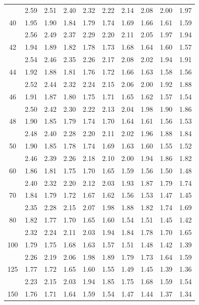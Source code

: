 \documentclass[lang=cn,10pt]{elegantbook}
\begin{document}
\begin{longtable}{c|ccccccccc}
      & 2.59 & 2.51 & 2.40 & 2.32 & 2.22 & 2.14 & 2.08 & 2.00 & 1.97 \\
    40& 1.95 & 1.90 & 1.84 & 1.79 & 1.74 & 1.69 & 1.66 & 1.61 & 1.59 \\
      & 2.56 & 2.49 & 2.37 & 2.29 & 2.20 & 2.11 & 2.05 & 1.97 & 1.94 \\
    42& 1.94 & 1.89 & 1.82 & 1.78 & 1.73 & 1.68 & 1.64 & 1.60 & 1.57 \\
      & 2.54 & 2.46 & 2.35 & 2.26 & 2.17 & 2.08 & 2.02 & 1.94 & 1.91 \\
    44& 1.92 & 1.88 & 1.81 & 1.76 & 1.72 & 1.66 & 1.63 & 1.58 & 1.56 \\
      & 2.52 & 2.44 & 2.32 & 2.24 & 2.15 & 2.06 & 2.00 & 1.92 & 1.88 \\
    46& 1.91 & 1.87 & 1.80 & 1.75 & 1.71 & 1.65 & 1.62 & 1.57 & 1.54 \\
      & 2.50 & 2.42 & 2.30 & 2.22 & 2.13 & 2.04 & 1.98 & 1.90 & 1.86 \\
    48& 1.90 & 1.85 & 1.79 & 1.74 & 1.70 & 1.64 & 1.61 & 1.56 & 1.53 \\
      & 2.48 & 2.40 & 2.28 & 2.20 & 2.11 & 2.02 & 1.96 & 1.88 & 1.84 \\
    50& 1.90 & 1.85 & 1.78 & 1.74 & 1.69 & 1.63 & 1.60 & 1.55 & 1.52 \\
      & 2.46 & 2.39 & 2.26 & 2.18 & 2.10 & 2.00 & 1.94 & 1.86 & 1.82 \\
    60& 1.86 & 1.81 & 1.75 & 1.70 & 1.65 & 1.59 & 1.56 & 1.50 & 1.48 \\
      & 2.40 & 2.32 & 2.20 & 2.12 & 2.03 & 1.93 & 1.87 & 1.79 & 1.74 \\
    70& 1.84 & 1.79 & 1.72 & 1.67 & 1.62 & 1.56 & 1.53 & 1.47 & 1.45 \\
      & 2.35 & 2.28 & 2.15 & 2.07 & 1.98 & 1.88 & 1.82 & 1.74 & 1.69 \\
    80& 1.82 & 1.77 & 1.70 & 1.65 & 1.60 & 1.54 & 1.51 & 1.45 & 1.42 \\
      & 2.32 & 2.24 & 2.11 & 2.03 & 1.94 & 1.84 & 1.78 & 1.70 & 1.65 \\
    100& 1.79 & 1.75 & 1.68 & 1.63 & 1.57 & 1.51 & 1.48 & 1.42 & 1.39 \\
      & 2.26 & 2.19 & 2.06 & 1.98 & 1.89 & 1.79 & 1.73 & 1.64 & 1.59 \\
    125& 1.77 & 1.72 & 1.65 & 1.60 & 1.55 & 1.49 & 1.45 & 1.39 & 1.36 \\
      & 2.23 & 2.15 & 2.03 & 1.94 & 1.85 & 1.75 & 1.68 & 1.59 & 1.54 \\
    150& 1.76 & 1.71 & 1.64 & 1.59 & 1.54 & 1.47 & 1.44 & 1.37 & 1.34 \\

\end{longtable}
\end{document}
